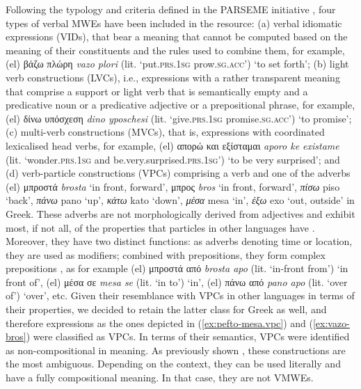 \documentclass[output=paper,colorlinks,citecolor=brown]{langscibook}
\begin{document}
Following the typology and criteria defined in the PARSEME initiative \citep{savary_etal_2017, ramisch_etal_2018, ramisch_etal_2020, savary_etal_2023}, four types of verbal MWEs have been included in the resource: (a) verbal idiomatic expressions (VIDs), that bear a meaning that cannot be computed based on the meaning of their constituents and the rules used to combine them, for example, (el) {{βάζω}} {{πλώρη}} \textit{vazo plori} (lit. `put.\textsc{prs.1sg} prow.\textsc{sg.acc}') `to set forth'; (b) light verb constructions (LVCs), i.e., expressions with a rather transparent meaning that comprise a support or light verb that is semantically empty and a predicative noun or a predicative adjective or a prepositional phrase, for example, (el) {{δίνω}} {{υπόσχεση}} \textit{dino yposchesi} (lit. `give.\textsc{prs.1sg} promise.\textsc{sg.acc}') `to promise'; (c) multi-verb constructions (MVCs), that is, expressions with coordinated lexicalised head verbs, for example, (el) {{απορώ}} {{και}} {{εξίσταμαι}} \textit{aporo ke existame} (lit. `wonder.\textsc{prs.1sg} and be.very.surprised.\textsc{prs.1sg}') `to be very surprised'; and (d) verb-particle constructions (VPCs) comprising a verb and one of the adverbs (el) {μπροστά} \textit{brosta} `in front, forward', {μπρος} \textit{bros} `in front, forward', \textit{πίσω} piso `back', \textit{πάνω} pano `up', \textit{κάτω} kato `down', \textit{μέσα} mesa `in', \textit{έξω} exo `out, outside' in Greek. These adverbs are not morphologically derived from adjectives and exhibit most, if not all, of the properties that particles in other languages have \citep{giouli_etal_2019}. Moreover, they have two distinct functions: as adverbs denoting time or location, they are used as modifiers; combined with prepositions, they form complex prepositions \citep{holton_etal_1997}, as for example (el) {{μπροστά από}} \textit{brosta apo} (lit. `in-front from') `in front of', (el) {{μέσα σε}} \textit{mesa se} (lit. `in to') `in', (el) {{πάνω από}} \textit{pano apo} (lit. `over of') `over', etc. Given their resemblance with VPCs in other languages in terms of their properties, we decided to retain the latter class for Greek as well, and therefore expressions as the ones depicted in (\ref{ex:pefto-mesa.vpc}) and (\ref{ex:vazo-bros}) were classified as VPCs. In terms of their semantics, VPCs were identified as non-compositional in meaning. As previously shown \citep{savary_etal_2019}, these constructions are the most ambiguous. Depending on the context, they can be used literally and have a fully compositional meaning. In that case, they are not VMWEs.
\end{document}

